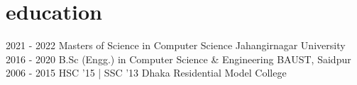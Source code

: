 \section*{education}

\begin{entrylist}
	\myentry
	{2021 - 2022}
	{Masters of Science {\normalfont in Computer Science}}
	{Jahangirnagar University}
	~
	\myentry
	{2016 - 2020}
	{B.Sc (Engg.) {\normalfont in Computer Science \& Engineering}}
	{BAUST, Saidpur}
	~
	\myentry
	{2006 - 2015}
	{HSC {\normalfont '15} | SSC {\normalfont '13}}
	{Dhaka Residential Model College}
	~
\end{entrylist}


